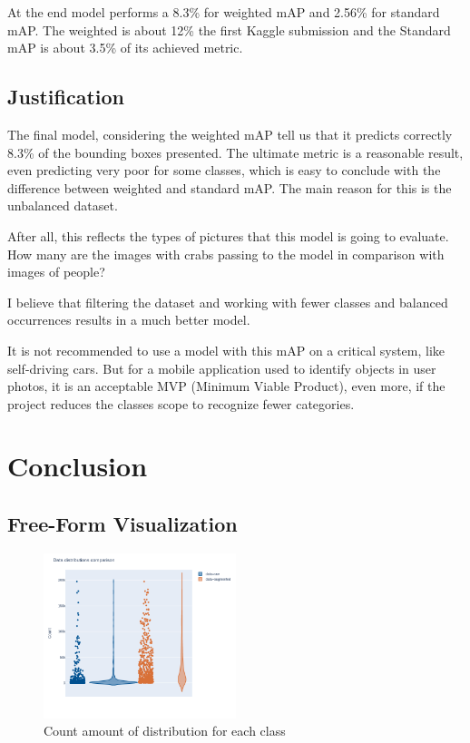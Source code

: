 \documentclass[11pt, a4paper, twocolumn]{article}
\begin{document}
At the end model performs a 8.3\% for weighted mAP and 2.56\% for standard mAP. The weighted is about 12\% the first Kaggle submission and the Standard mAP is about 3.5\% of its achieved metric.

\subsection{Justification}

The final model, considering the weighted mAP tell us that it predicts correctly 8.3\% of the bounding boxes presented. The ultimate metric is a reasonable result, even predicting very poor for some classes, which is easy to conclude with the difference between weighted and standard mAP. The main reason for this is the unbalanced dataset.

After all, this reflects the types of pictures that this model is going to evaluate. How many are the images with crabs passing to the model in comparison with images of people?

I believe that filtering the dataset and working with fewer classes and balanced occurrences results in a much better model.

It is not recommended to use a model with this mAP on a critical system, like self-driving cars. But for a mobile application used to identify objects in user photos, it is an acceptable MVP (Minimum Viable Product), even more, if the project reduces the classes scope to recognize fewer categories.

\section{Conclusion}
\subsection{Free-Form Visualization}

\begin{figure}[!ht]
	\centering
	\includegraphics[width=0.5\textwidth]{data-aug2.png}
	\caption{Count amount of distribution for each class}
	\label{fig:aug2}
\end{figure}
\end{document}
